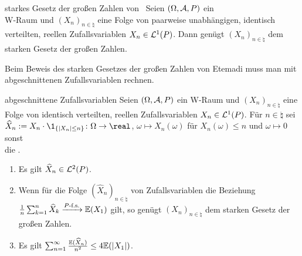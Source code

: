 \begin{Satz}{starkes Gesetz der großen Zahlen von \upshape\,\!}
    Seien $(\Omega, \mathcal{A}, P)$ ein\\
    W-Raum und $(X_n)_{n \in \natural}$
    eine Folge von paarweise unabhängigen, identisch verteilten, reellen Zufallsvariablen
    $X_n \in \mathcal{L}^1(P)$.
    Dann genügt $(X_n)_{n \in \natural}$ dem starken Gesetz der großen Zahlen.
\end{Satz}

\linie
\pagebreak

\begin{Bem}
    Beim Beweis des starken Gesetzes der großen Zahlen von Etemadi muss man mit
    abgeschnittenen Zufallsvariablen rechnen.
\end{Bem}

\begin{Lemma}{abgeschnittene Zufallsvariablen}
    Seien $(\Omega, \mathcal{A}, P)$ ein W-Raum und $(X_n)_{n \in \natural}$
    eine Folge von identisch verteilten, reellen Zufallsvariablen $X_n \in \mathcal{L}^1(P)$.
    Für $n \in \natural$ sei\\
    $\widehat{X}_n := X_n \cdot \1_{\{|X_n| \le n\}}\colon \Omega \rightarrow \real$,
    $\omega \mapsto X_n(\omega)$ für $X_n(\omega) \le n$ und $\omega \mapsto 0$ sonst\\
    die .
    \begin{enumerate}
        \item
        Es gilt $\widehat{X}_n \in \mathcal{L}^2(P)$.
        
        \item
        Wenn für die Folge $(\widehat{X}_n)_{n \in \natural}$ von Zufallsvariablen
        die Beziehung $\frac{1}{n} \sum_{k=1}^n \widehat{X}_k \xrightarrow{P\text{-f.s.}} \mathbb{E}(X_1)$
        gilt, so genügt $(X_n)_{n \in \natural}$ dem starken Gesetz der großen Zahlen.
        
        \item
        Es gilt $\sum_{n=1}^\infty \frac{\mathbb{E}(\widehat{X}_n)}{n^2} \le 4 \mathbb{E}(|X_1|)$.
    \end{enumerate}
\end{Lemma}

\linie

